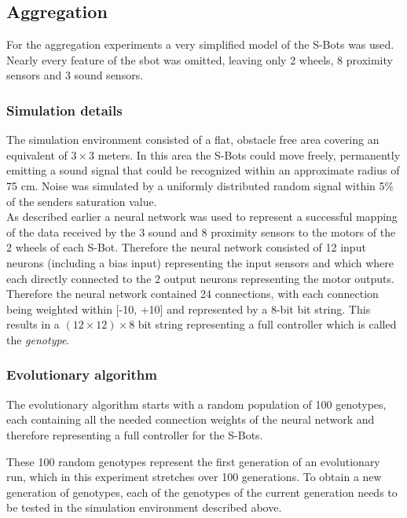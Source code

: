 %
%

\subsection{Aggregation}
For the aggregation experiments a very simplified model of the S-Bots was used.
Nearly every feature of the sbot was omitted, leaving only 2 wheels, 8
proximity sensors and 3 sound sensors.

\subsubsection{Simulation details}
The simulation environment consisted of a flat, obstacle free area covering an
equivalent of $3\times 3$ meters. In this area the S-Bots could move freely, permanently
emitting a sound signal that could be recognized within an approximate
radius of 75 cm. Noise was simulated by a uniformly distributed random signal
within 5\% of the senders saturation value.
\ \\

As described earlier a neural network was used to represent a successful
mapping of the data received by the 3 sound and 8 proximity sensors to the
motors of the 2 wheels of each S-Bot. Therefore the neural network consisted
of 12 input neurons (including a bias input) representing the input sensors
and which where each directly connected to the 2 output neurons representing
the motor outputs. Therefore the neural network contained 24 connections, with
each connection being weighted within [-10, +10] and represented by a 8-bit
bit string. This results in a $(12 \times 12) \times 8$ bit string representing a full
controller which is called the \textit{genotype}.

\subsubsection{Evolutionary algorithm}
The evolutionary algorithm starts with a random population of 100 genotypes,
each containing all the needed connection weights of the neural network and
therefore representing a full controller for the S-Bots.

These 100 random genotypes represent the first generation of an evolutionary
run, which in this experiment stretches over 100 generations.
To obtain a new generation of genotypes, each of the genotypes of the
current generation needs to be tested in the simulation environment described
above.
\ \\

